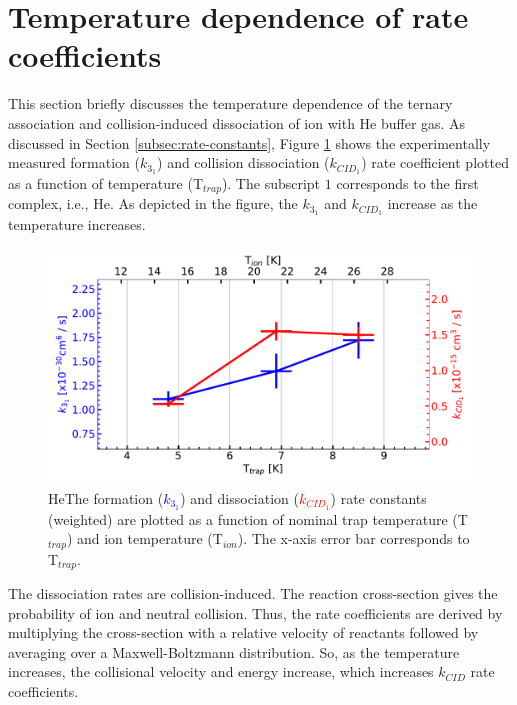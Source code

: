 \section{Temperature dependence of rate coefficients}
\label{subsec:temp-dependence}

This section briefly discusses the temperature dependence of the ternary
association and collision-induced dissociation of \CD ion with He buffer gas.
As discussed in Section \ref{subsec:rate-constants}, Figure
\ref{fig:off:rate-constants:f(t)} shows the experimentally measured formation
($k_{3_1}$) and collision dissociation ($k_{CID_1}$) rate coefficient plotted
as a function of temperature (T$_{trap}$). The subscript $1$ corresponds to the
first complex, i.e., He\CD. As depicted in the figure, the $k_{3_1}$ and
$k_{CID_1}$ increase as the temperature increases.

\begin{figure}[!htb]
    \centering
    \includegraphics[width=1\textwidth]{figures/measurements/kinetics/functionOf_T/off_k3_kCID_as_functionOfT_with_Tcol.pdf}
    \caption{He\CD The formation (\textcolor{blue}{$k_{3_1}$}) and dissociation (\textcolor{red}{$k_{CID_1}$}) rate constants (weighted) are plotted as a function of nominal trap temperature (T$_{trap}$) and ion temperature (T$_{ion}$). The x-axis error bar corresponds to T$_{trap}$. }
    \label{fig:off:rate-constants:f(t)}
\end{figure}

The dissociation rates are collision-induced. The reaction cross-section gives
the probability of ion and neutral collision. Thus, the rate coefficients are
derived by multiplying the cross-section with a relative velocity of reactants
followed by averaging over a Maxwell-Boltzmann distribution. So, as the
temperature increases, the collisional velocity and energy increase, which
increases $k_{CID}$ rate coefficients.

